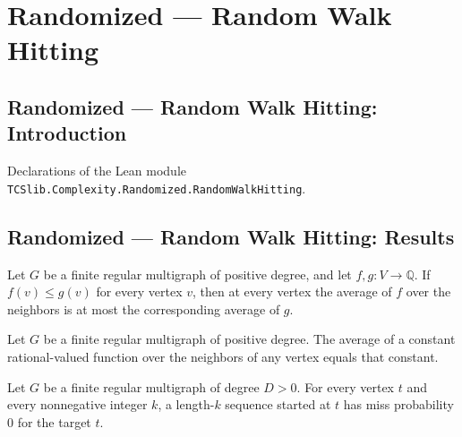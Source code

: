 \section{Randomized --- Random Walk Hitting}
\subsection*{Randomized --- Random Walk Hitting: Introduction}

Declarations of the Lean module \texttt{TCSlib.Complexity.Randomized.RandomWalkHitting}.

\subsection*{Randomized --- Random Walk Hitting: Results}

\begin{theorem}
\label{Randomized.RegularMultigraph.avg_mono}
\leanok
{}
Let $G$ be a finite regular multigraph of positive degree, and let $f,g:V\to\mathbb Q$.
If $f(v)\le g(v)$ for every vertex $v$, then at every vertex the average of $f$ over the
neighbors is at most the corresponding average of $g$.
\end{theorem}

\begin{theorem}
\label{Randomized.RegularMultigraph.avg_const}
\leanok
{}
Let $G$ be a finite regular multigraph of positive degree. The average of a constant
rational-valued function over the neighbors of any vertex equals that constant.
\end{theorem}

\begin{theorem}
\label{Randomized.RegularMultigraph.missProb_self}
\leanok
{}
Let $G$ be a finite regular multigraph of degree $D>0$. For every vertex $t$ and every
nonnegative integer $k$, a length-$k$ sequence started at $t$ has miss probability $0$
for the target $t$.
\end{theorem}

